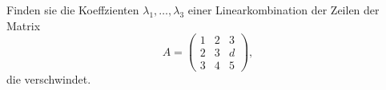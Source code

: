 Finden sie die Koeffzienten $\lambda_1,\dots,\lambda_3$ einer Linearkombination
der Zeilen der Matrix
\[
A=\begin{pmatrix}
1&2&3\\
2&3&d\\
3&4&5
\end{pmatrix},
\]
die verschwindet.

\begin{loesung}
\end{loesung}

